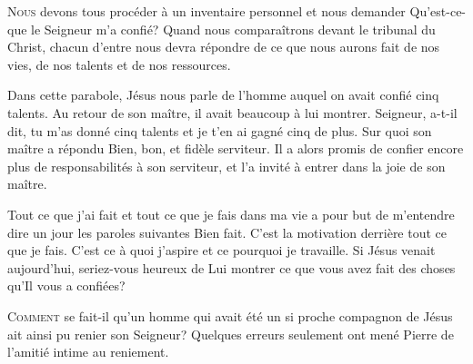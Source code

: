 \lettrine{N}{ous} devons tous procéder à un inventaire personnel
 et nous demander\frcolon{} 
 \Og Qu'est-ce-que le Seigneur m'a confié? \Fg{}
 Quand nous comparaîtrons devant le tribunal du Christ,
 chacun d'entre nous devra répondre de ce que nous aurons fait de nos vies,
 de nos talents et de nos ressources. 


Dans cette parabole, Jésus nous parle de l'homme auquel on avait confié
 cinq talents. Au retour de son maître, il avait beaucoup à lui montrer.
 \Og Seigneur, a-t-il dit, 
 tu m'as donné cinq talents et je t'en ai gagné cinq de plus. \Fg{}
 Sur quoi son maître a répondu\frcolon{} 
 \Og Bien, bon, et fidèle serviteur. \Fg{}
 Il a alors promis de confier encore plus de responsabilités à son serviteur,
 et l'a invité à entrer dans \Og la joie de son maître. \Fg{}

Tout ce que j'ai fait et tout ce que je fais dans ma vie
 a pour but de m'entendre dire un jour les paroles suivantes\frcolon{} 
 \Og Bien fait. \Fg{} 
 C'est la motivation derrière tout ce que je fais.
 C'est ce à quoi j'aspire et ce pourquoi je travaille.
 Si Jésus venait aujourd'hui, seriez-vous heureux de Lui montrer
 ce que vous avez fait des choses qu'Il vous a confiées? 

\dvrule






\lettrine{C}{omment} se fait-il qu'un homme qui avait été un si proche
 compagnon de Jésus ait ainsi pu renier son Seigneur?
 Quelques erreurs seulement ont mené Pierre de l'amitié intime au reniement. 


